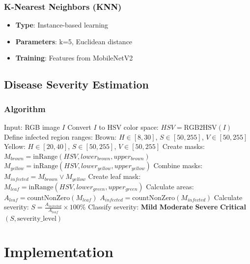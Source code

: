 \documentclass[11pt,a4paper]{article}
\begin{document}
\subsubsection{K-Nearest Neighbors (KNN)}
\begin{itemize}
    \item \textbf{Type}: Instance-based learning
    \item \textbf{Parameters}: k=5, Euclidean distance
    \item \textbf{Training}: Features from MobileNetV2
\end{itemize}

\subsection{Disease Severity Estimation}

\subsubsection{Algorithm}
\begin{algorithm}[h]
\caption{Disease Severity Calculation}
\begin{algorithmic}[1]
\STATE Input: RGB image $I$
\STATE Convert $I$ to HSV color space: $HSV = \text{RGB2HSV}(I)$
\STATE Define infected region ranges:
\STATE \quad Brown: $H \in [8, 30]$, $S \in [50, 255]$, $V \in [50, 255]$
\STATE \quad Yellow: $H \in [20, 40]$, $S \in [50, 255]$, $V \in [50, 255]$
\STATE Create masks: $M_{brown} = \text{inRange}(HSV, lower_{brown}, upper_{brown})$
\STATE \quad $M_{yellow} = \text{inRange}(HSV, lower_{yellow}, upper_{yellow})$
\STATE Combine masks: $M_{infected} = M_{brown} \lor M_{yellow}$
\STATE Create leaf mask: $M_{leaf} = \text{inRange}(HSV, lower_{green}, upper_{green})$
\STATE Calculate areas: $A_{leaf} = \text{countNonZero}(M_{leaf})$
\STATE \quad $A_{infected} = \text{countNonZero}(M_{infected})$
\STATE Calculate severity: $S = \frac{A_{infected}}{A_{leaf}} \times 100\%$
\STATE Classify severity:
    \STATE \textbf{Mild}
    \STATE \textbf{Moderate}
    \STATE \textbf{Severe}
\ELSE
    \STATE \textbf{Critical}
\ENDIF
\RETURN $(S, \text{severity\_level})$
\end{algorithmic}
\end{algorithm}

\section{Implementation}
\end{document}

